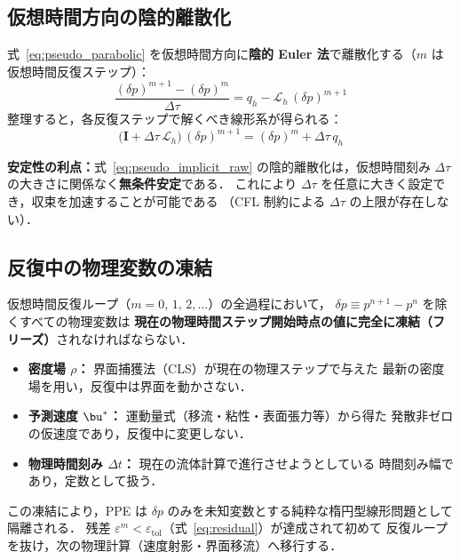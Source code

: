 \subsection{仮想時間方向の陰的離散化}
\label{sec:pseudo_implicit}

式~\eqref{eq:pseudo_parabolic} を仮想時間方向に\textbf{陰的 Euler 法}で離散化する（$m$ は仮想時間反復ステップ）：
\begin{equation}
  \frac{(\delta p)^{m+1} - (\delta p)^m}{\Delta\tau} = q_h - \mathcal{L}_h\,(\delta p)^{m+1}
  \label{eq:pseudo_implicit_raw}
\end{equation}
整理すると，各反復ステップで解くべき線形系が得られる：
\begin{equation}
  \bigl(\mathbf{I} + \Delta\tau\,\mathcal{L}_h\bigr)\,(\delta p)^{m+1}
  = (\delta p)^m + \Delta\tau\, q_h
  \label{eq:pseudo_linear}
\end{equation}

\textbf{安定性の利点：}式~\eqref{eq:pseudo_implicit_raw} の陰的離散化は，仮想時間刻み $\Delta\tau$ の大きさに関係なく\textbf{無条件安定}である．
これにより $\Delta\tau$ を任意に大きく設定でき，収束を加速することが可能である
（CFL 制約による $\Delta\tau$ の上限が存在しない）．

\subsection{反復中の物理変数の凍結}
\label{sec:pseudo_variable_freeze}

仮想時間反復ループ（$m = 0,\,1,\,2,\ldots$）の全過程において，
$\delta p \equiv p^{n+1}-p^n$ を除くすべての物理変数は
\textbf{現在の物理時間ステップ開始時点の値に完全に凍結（フリーズ）}されなければならない．
\begin{itemize}
  \item \textbf{密度場 $\rho$：} 界面捕獲法（CLS）が現在の物理ステップで与えた
        最新の密度場を用い，反復中は界面を動かさない．
  \item \textbf{予測速度 $\bu^*$：} 運動量式（移流・粘性・表面張力等）から得た
        発散非ゼロの仮速度であり，反復中に変更しない．
  \item \textbf{物理時間刻み $\Delta t$：} 現在の流体計算で進行させようとしている
        時間刻み幅であり，定数として扱う．
\end{itemize}
この凍結により，PPE は $\delta p$ のみを未知変数とする純粋な楕円型線形問題として隔離される．
残差 $\varepsilon^m < \varepsilon_\mathrm{tol}$（式~\eqref{eq:residual}）が達成されて初めて
反復ループを抜け，次の物理計算（速度射影・界面移流）へ移行する．

